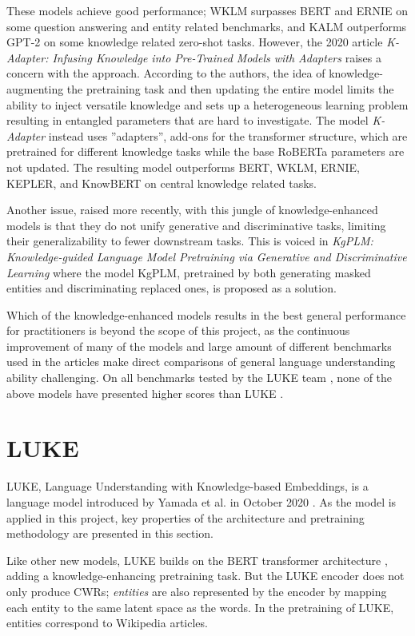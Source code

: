 \documentclass[main.tex]{subfiles}
\begin{document}
These models achieve good performance; WKLM surpasses BERT and ERNIE on some question answering and entity related benchmarks, and KALM outperforms GPT-2 on some knowledge related zero-shot tasks.
However, the 2020 article \emph{K-Adapter: Infusing Knowledge into Pre-Trained Models with Adapters} \cite{wang2020kadapter} raises a concern with the approach.
According to the authors, the idea of knowledge-augmenting the pretraining task and then updating the entire model limits the ability to inject versatile knowledge and sets up a heterogeneous learning problem resulting in entangled parameters that are hard to investigate.
The model \emph{K-Adapter} instead uses ''adapters'', add-ons for the transformer structure, which are pretrained for different knowledge tasks while the base RoBERTa parameters are not updated.
The resulting model outperforms BERT, WKLM, ERNIE, KEPLER, and KnowBERT on central knowledge related tasks.

Another issue, raised more recently, with this jungle of knowledge-enhanced models is that they do not unify generative and discriminative tasks, limiting their generalizability to fewer downstream tasks.
This is voiced in \emph{KgPLM: Knowledge-guided Language Model Pretraining via Generative and Discriminative Learning} \cite{he2020kgplm} where the model KgPLM, pretrained by both generating masked entities and discriminating replaced ones, is proposed as a solution.

Which of the knowledge-enhanced models results in the best general performance for practitioners is beyond the scope of this project, as the continuous improvement of many of the models and large amount of different benchmarks used in the articles make direct comparisons of general language understanding ability challenging.
On all benchmarks tested by the LUKE team \cite{yamada2020luke}, none of the above models have presented higher scores than LUKE \cite[Sec. 4]{yamada2020luke}.


\section{LUKE}
\label{sec:LUKE}
LUKE, Language Understanding with Knowledge-based Embeddings, is a language model introduced by Yamada et al. in October 2020 \cite{yamada2020luke}.
As the model is applied in this project, key properties of the architecture and pretraining methodology are presented in this section.

Like other new models, LUKE builds on the BERT transformer architecture \cite{devlin2019bert}, adding a knowledge-enhancing pretraining task.
But the LUKE encoder does not only produce CWRs; 
\emph{entities} are also represented by the encoder by mapping each entity to the same latent space as the words.
In the pretraining of LUKE, entities correspond to Wikipedia articles.
\end{document}
